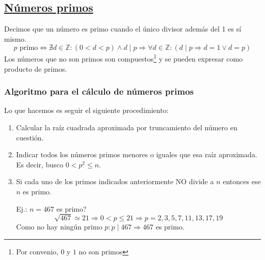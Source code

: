 \documentclass[10pt,a4paper,openright]{book}
\begin{document}
\subsection*{\underline{Números primos}}
Decimos que un número es primo cuando el único divisor además del 1 es sí mismo.
$$p\mbox{ primo}\Leftrightarrow \nexists d\in \mathbb Z: (0<d<p)\wedge d\mid p\Rightarrow \forall d\in \mathbb Z: (d\mid p\Rightarrow d=1\vee d=p)$$
Los números que no son primos son compuestos\footnote{Por convenio, $0$ y $1$ no son primos} y se pueden expresar como producto de primos.

\subsubsection*{Algoritmo para el cálculo de números primos}
Lo que hacemos es seguir el siguiente procedimiento:
\begin{enumerate}
\item Calcular la raíz cuadrada aproximada por truncamiento del número en cuestión.
\item Indicar todos los números primos menores o iguales que esa raíz aproximada. Es decir, busco $0<p^2\leq n$.
\item Si cada uno de los primos indicados anteriormente NO divide a $n$ entonces ese $n$ es primo.\par
Ej.: $n=467$ es primo?
$$\sqrt{467}\simeq 21\Rightarrow 0<p\leq 21\Rightarrow p=2,3,5,7,11,13,17,19$$
Como no hay ningún primo $p: p\mid 467\Rightarrow 467$ es primo.
\end{enumerate}
\end{document}
